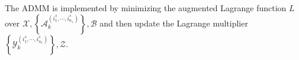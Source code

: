 \documentclass[12pt, draftcls, onecolumn]{IEEEtran}
\theoremstyle{plain}
\theoremstyle{definition}
\theoremstyle{remark}
\begin{document}
The ADMM is implemented by minimizing the augmented Lagrange function $L$ over $\mathcal{X},\left\{\mathcal{A}^{(i^s_{1},\cdots,i^s_{n_1})}_k\right\},\mathcal{B}$ and then update the Lagrange multiplier $\left\{\mathcal{Y}^{(i^s_{1},\cdots,i^s_{n_1})}_k\right\},\mathcal{Z}$.
\end{document}
